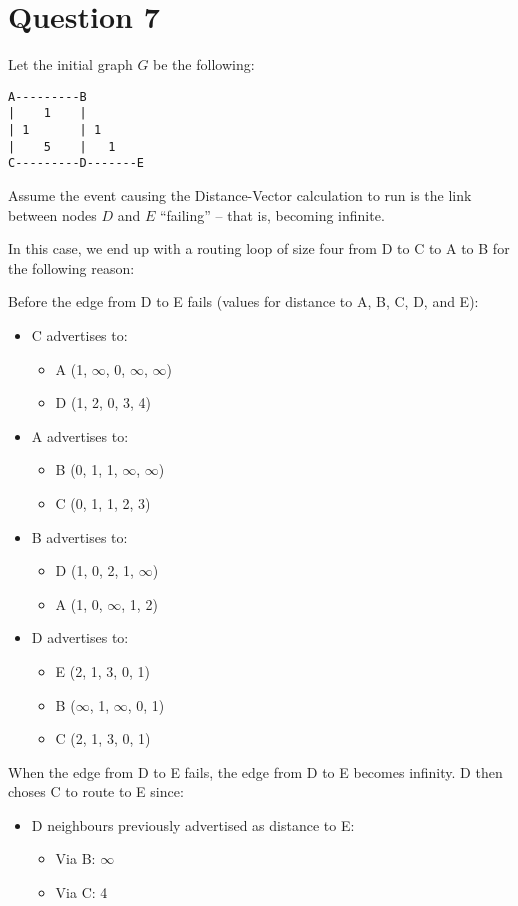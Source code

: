 \documentclass[12pt]{article}
\begin{document}
\section*{Question 7}
Let the initial graph $G$ be the following:
\begin{verbatim}
A---------B
|    1    |
| 1       | 1
|    5    |   1
C---------D-------E
\end{verbatim}

Assume the event causing the Distance-Vector calculation to run is the link between nodes $D$ and $E$ ``failing'' -- that is, becoming infinite.

In this case, we end up with a routing loop of size four from D to C to A to B for the following reason:

Before the edge from D to E fails (values for distance to A, B, C, D, and E):
\begin{itemize}
\item C advertises to:
\begin{itemize}
\item A (1, $\infty$, 0, $\infty$, $\infty$)
\item D (1, 2, 0, 3, 4)
\end{itemize}
\item A advertises to:
\begin{itemize}
\item B (0, 1, 1, $\infty$, $\infty$)
\item C (0, 1, 1, 2, 3)
\end{itemize}
\item B advertises to:
\begin{itemize}
\item D (1, 0, 2, 1, $\infty$)
\item A (1, 0, $\infty$, 1, 2)
\end{itemize}
\item D advertises to:
\begin{itemize}
\item E (2, 1, 3, 0, 1)
\item B ($\infty$, 1, $\infty$, 0, 1)
\item C (2, 1, 3, 0, 1)
\end{itemize}
\end{itemize}

When the edge from D to E fails, the edge from D to E becomes infinity. D then choses C to route to E since:
\begin{itemize}
\item D neighbours previously advertised as distance to E:
\begin{itemize}
\item Via B: $\infty$
\item Via C: 4
\end{itemize}
\end{itemize}
\end{document}
